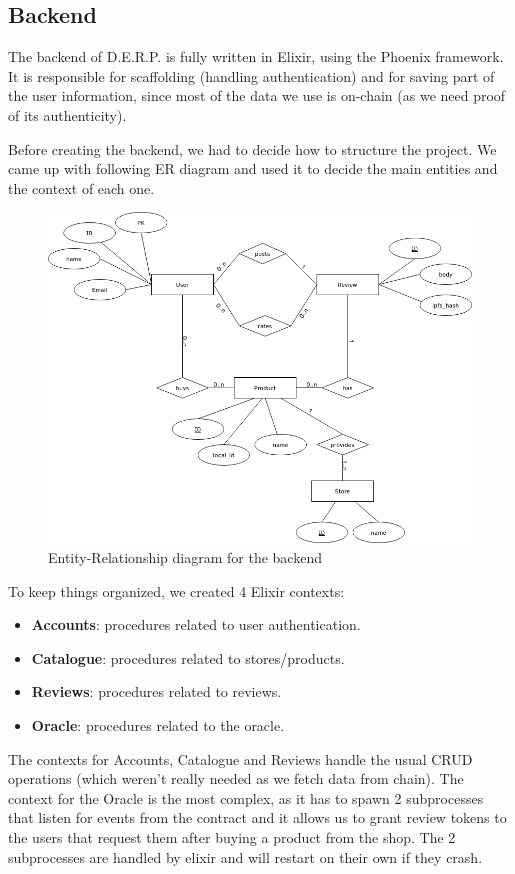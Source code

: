 \documentclass[12pt,a4paper,oneside]{article}
\theoremstyle{definition}
\begin{document}
\subsection{Backend}

The backend of D.E.R.P. is fully written in Elixir, using the Phoenix framework. It is responsible for scaffolding (handling authentication) and for saving part of the user information, since most of the data we use is on-chain (as we need proof of its authenticity).

Before creating the backend, we had to decide how to structure the project. We came up with following ER diagram and used it to decide the main entities and the context of each one.

\begin{figure}[ht]
	\centering
	\includegraphics[width=0.6\linewidth]{figures/derp_er.drawio.png}
	\caption{Entity-Relationship diagram for the backend}
	\label{fig:er-diagram}
\end{figure}

To keep things organized, we created 4 Elixir contexts:
\begin{itemize}
	\item \textbf{Accounts}: procedures related to user authentication.
	\item \textbf{Catalogue}: procedures related to stores/products.
	\item \textbf{Reviews}: procedures related to reviews.
	\item \textbf{Oracle}: procedures related to the oracle.
\end{itemize}

The contexts for Accounts, Catalogue and Reviews handle the usual CRUD operations (which weren't really needed as we fetch data from chain).
The context for the Oracle is the most complex, as it has to spawn 2 subprocesses that listen for events from the contract and it allows us to grant review tokens to the users that request them after buying a product from the shop. The 2 subprocesses are handled by elixir and will restart on their own if they crash.
\end{document}
